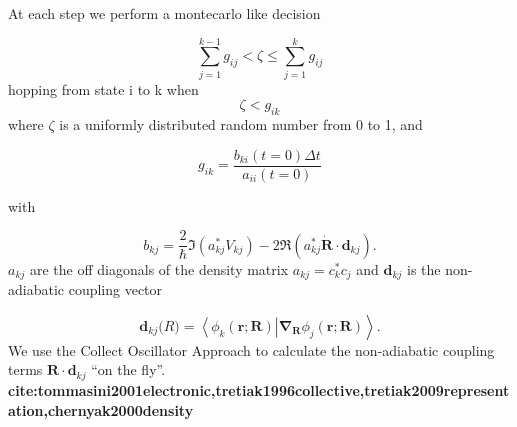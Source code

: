 At each step we perform a montecarlo like decision

\begin{equation} \label{eq:tullyjump2} 
\sum_{j=1}^{k-1}g_{ij} < \zeta  \le \sum_{j=1}^{k}g_{ij}
\end{equation}
hopping from state i to k when
\begin{equation} \label{eq:tullyjump1} 
  \zeta < g_{ik}
\end{equation}
where \(\zeta\) is a uniformly distributed random number from 0 to 1, and

\begin{equation}
g_{ik} = \frac{b_{ki}(t=0)\Delta t}{a_{ii}(t=0)}
\end{equation}

with

\begin{equation} \label{eq:tullyb2a} 
b_{kj} =
        \frac{2}{\hbar}\Im\left(a_{kj}^*V_{kj}\right) - 2\Re\left(a_{kj}^*
         \dot{\mathbf{R}} \cdot \mathbf{d}_{kj}\right).
\end{equation}
$a_{kj}$ are the off diagonals of the density matrix $a_{kj} = c_k^* c_j$ and
$\mathbf{d}_{kj}$ is the non-adiabatic coupling vector

\begin{equation} \label{eq:tullynacoupling} 
\mathbf{d}_{kj}\mathbf(R) =
  \left<\phi_{k}(\mathbf{r};\mathbf{R})\right|\mathbf{\nabla}_{\mathbf{R}}\left.\phi_j(\mathbf{r};\mathbf{R})\right>.
\end{equation}
We use the Collect Oscillator Approach to calculate the non-adiabatic coupling terms \(\mathbf{R} \cdot \mathbf{d}_{kj}\) ``on the
fly''. \textbf{cite:tommasini2001electronic,tretiak1996collective,tretiak2009representation,chernyak2000density}
